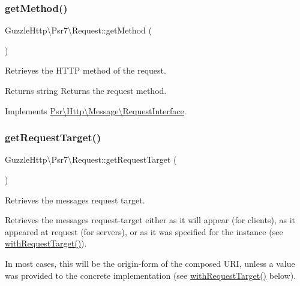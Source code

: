 \subsubsection{\texorpdfstring{get\+Method()}{getMethod()}}
{\footnotesize\ttfamily Guzzle\+Http\textbackslash{}\+Psr7\textbackslash{}\+Request\+::get\+Method (\begin{DoxyParamCaption}{ }\end{DoxyParamCaption})}

Retrieves the H\+T\+TP method of the request.

\begin{DoxyReturn}{Returns}
string Returns the request method. 
\end{DoxyReturn}


Implements \hyperlink{interfacePsr_1_1Http_1_1Message_1_1RequestInterface_a1aceab5bc5a2067500f4a80ac314fbc9}{Psr\textbackslash{}\+Http\textbackslash{}\+Message\textbackslash{}\+Request\+Interface}.

\mbox{\label{classGuzzleHttp_1_1Psr7_1_1Request_a0dae2eaf80f250109b69b9e7fb504b3c}} 
\subsubsection{\texorpdfstring{get\+Request\+Target()}{getRequestTarget()}}
{\footnotesize\ttfamily Guzzle\+Http\textbackslash{}\+Psr7\textbackslash{}\+Request\+::get\+Request\+Target (\begin{DoxyParamCaption}{ }\end{DoxyParamCaption})}

Retrieves the message\textquotesingle{}s request target.

Retrieves the message\textquotesingle{}s request-\/target either as it will appear (for clients), as it appeared at request (for servers), or as it was specified for the instance (see \hyperlink{classGuzzleHttp_1_1Psr7_1_1Request_aa05ac6946c5b3f50b5b136142ccf193f}{with\+Request\+Target()}).

In most cases, this will be the origin-\/form of the composed U\+RI, unless a value was provided to the concrete implementation (see \hyperlink{classGuzzleHttp_1_1Psr7_1_1Request_aa05ac6946c5b3f50b5b136142ccf193f}{with\+Request\+Target()} below).

